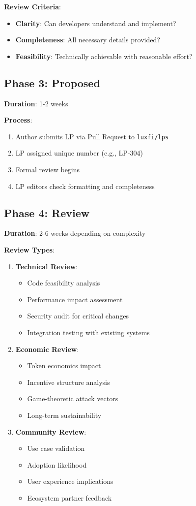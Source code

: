 \textbf{Review Criteria}:
\begin{itemize}
\item \textbf{Clarity}: Can developers understand and implement?
\item \textbf{Completeness}: All necessary details provided?
\item \textbf{Feasibility}: Technically achievable with reasonable effort?
\end{itemize}

\subsection{Phase 3: Proposed}

\textbf{Duration}: 1-2 weeks

\textbf{Process}:
\begin{enumerate}
\item Author submits LP via Pull Request to \texttt{luxfi/lps}
\item LP assigned unique number (e.g., LP-304)
\item Formal review begins
\item LP editors check formatting and completeness
\end{enumerate}

\subsection{Phase 4: Review}

\textbf{Duration}: 2-6 weeks depending on complexity

\textbf{Review Types}:

\begin{enumerate}
\item \textbf{Technical Review}:
\begin{itemize}
\item Code feasibility analysis
\item Performance impact assessment
\item Security audit for critical changes
\item Integration testing with existing systems
\end{itemize}

\item \textbf{Economic Review}:
\begin{itemize}
\item Token economics impact
\item Incentive structure analysis
\item Game-theoretic attack vectors
\item Long-term sustainability
\end{itemize}

\item \textbf{Community Review}:
\begin{itemize}
\item Use case validation
\item Adoption likelihood
\item User experience implications
\item Ecosystem partner feedback
\end{itemize}
\end{enumerate}


